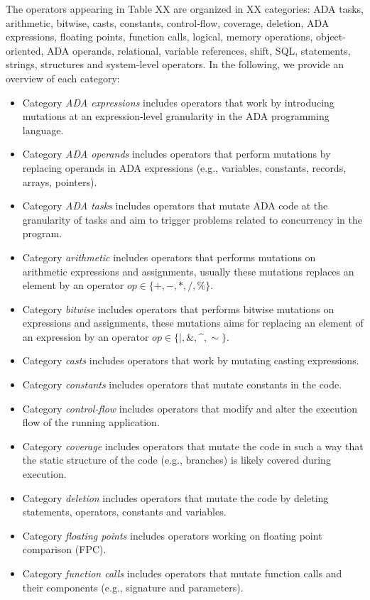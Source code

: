 The operators appearing in Table XX are organized in XX categories: ADA tasks, arithmetic, bitwise, casts, constants, control-flow, coverage, deletion, ADA expressions, floating points, function calls, logical, memory operations, object-oriented, ADA operands, relational, variable references, shift, SQL, statements, strings, structures and system-level operators. In the following, we provide an overview of each category:
\begin{itemize}
\item Category \emph{ADA expressions} includes operators that work by introducing mutations at an expression-level granularity in the ADA programming language. 
\item Category \emph{ADA operands} includes operators that perform mutations by replacing operands in ADA expressions (e.g., variables, constants, records, arrays, pointers).
\item Category \emph{ADA tasks} includes operators that mutate ADA code at the granularity of tasks and aim to trigger problems related to concurrency in the program.
\item Category \emph{arithmetic} includes operators that performs mutations on arithmetic expressions and assignments, usually these mutations replaces an element by an operator $op \in \{+, -, *, /, \%\}$. 
\item Category \emph{bitwise} includes operators that performs bitwise mutations on expressions and assignments, these mutations aims for replacing an element of an expression by an operator $op \in \{\mid, \&, \^{}, \sim\}$. 
\item Category \emph{casts} includes operators that work by mutating casting expressions.
\item Category \emph{constants} includes operators that mutate constants in the code. 
\item Category \emph{control-flow} includes operators that modify and alter the execution flow of the running application.
\item Category \emph{coverage} includes operators that mutate the code in such a way that the static structure of the code (e.g., branches) is likely covered during execution.
\item Category \emph{deletion} includes operators that mutate the code by deleting statements, operators, constants and variables.  
\item Category \emph{floating points} includes operators working on floating point comparison (FPC).
\item Category \emph{function calls} includes operators that mutate function calls and their components (e.g., signature and parameters).

\end{itemize}
